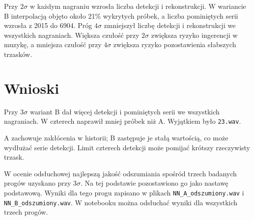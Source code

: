 \documentclass[11pt,a4paper]{article}
\begin{document}
Przy $2\sigma$ w każdym nagraniu wzrosła liczba detekcji i rekonstrukcji. W wariancie B interpolacją objęto około 21\% wykrytych próbek, a liczba pominiętych serii wzrosła z 2015 do 6904. Próg $4\sigma$ zmniejszył liczbę detekcji i rekonstrukcji we wszystkich nagraniach. Większa czułość przy $2\sigma$ zwiększa ryzyko ingerencji w muzykę, a mniejsza czułość przy $4\sigma$ zwiększa ryzyko pozostawienia słabszych trzasków.

\section{Wnioski}
Przy $3\sigma$ wariant B dał więcej detekcji i pominiętych serii we wszystkich nagraniach. W czterech naprawił mniej próbek niż A. Wyjątkiem było \texttt{23.wav}.

A zachowuje zakłócenia w historii; B zastępuje je stałą wartością, co może wydłużać serie detekcji. Limit czterech detekcji może pomijać krótszy rzeczywisty trzask.

W ocenie odsłuchowej najlepszą jakość odszumiania spośród trzech badanych progów uzyskano przy $3\sigma$. Na tej podstawie pozostawiono go jako nastawę podstawową. Wyniki dla tego progu zapisano w plikach \texttt{NN\_A\_odszumiony.wav} i \texttt{NN\_B\_odszumiony.wav}. W notebooku można odsłuchać wyniki dla wszystkich trzech progów.
\end{document}
